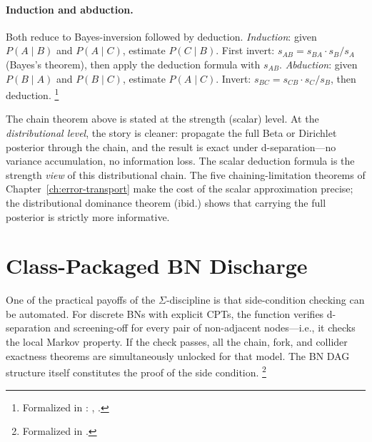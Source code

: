 \documentclass[11pt,openany]{report}
\begin{document}
\paragraph{Induction and abduction.}
Both reduce to Bayes-inversion followed by deduction.
\emph{Induction}: given $P(A \mid B)$ and $P(A \mid C)$, estimate
$P(C \mid B)$.  First invert:
$s_{AB} = s_{BA} \cdot s_B / s_A$ (Bayes's theorem), then apply
the deduction formula with $s_{AB}$.
\emph{Abduction}: given $P(B \mid A)$ and $P(B \mid C)$, estimate
$P(A \mid C)$.  Invert:
$s_{BC} = s_{CB} \cdot s_C / s_B$, then deduction.%
\footnote{Formalized in
:
,
.}

The chain theorem above is stated at the strength (scalar) level.
At the \emph{distributional level}, the story is cleaner: propagate
the full Beta or Dirichlet posterior through the chain, and the
result is exact under d-separation---no variance accumulation, no
information loss.  The scalar deduction formula is the strength
\emph{view} of this distributional chain.  The five
chaining-limitation theorems of Chapter~\ref{ch:error-transport}
make the cost of the scalar approximation precise; the distributional
dominance theorem (ibid.) shows that carrying the full posterior is
strictly more informative.



\section{Class-Packaged BN Discharge}

One of the practical payoffs of the $\Sigma$-discipline is that
side-condition checking can be automated.  For discrete BNs with
explicit CPTs, the function
 verifies d-separation and
screening-off for every pair of non-adjacent nodes---i.e., it
checks the local Markov property.  If the check passes, all the
chain, fork, and collider exactness theorems are simultaneously
unlocked for that model.  The BN DAG structure itself constitutes
the proof of the side condition.%
\footnote{Formalized in
.}
\end{document}
